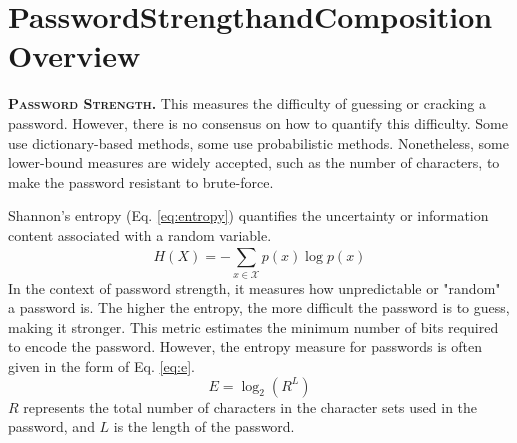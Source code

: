 \section{Password\;Strength\;and\;Composition\;Overview}
% 


\textbf{\textsc{Password Strength.}}\: This measures the difficulty of guessing or cracking a password. However, there is no consensus on how to quantify this difficulty. Some use dictionary-based methods, some use probabilistic methods. Nonetheless, some lower-bound measures are widely accepted, such as the number of characters, to make the password resistant to brute-force.

Shannon's entropy (Eq. \ref{eq:entropy}) quantifies the uncertainty or information content associated with a random variable. \begin{equation}\label{eq:entropy}
H(X) = -\sum_{x\in\mathcal{X}}^{} p(x) \log p(x)
\end{equation} In the context of password strength, it measures how unpredictable or "random" a password is. The higher the entropy, the more difficult the password is to guess, making it stronger. This metric estimates the minimum number of bits required to encode the password. However, the entropy measure for passwords is often given in the form of Eq. \ref{eq:e}.
\begin{equation}\label{eq:e}
E = \log_2(R^L)
\end{equation}
$R$ represents the total number of characters in the character sets used in the password, and $L$ is the length of the password.

